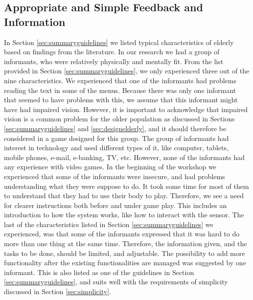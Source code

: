 \subsection{Appropriate and Simple Feedback and Information}
In Section \ref{sec:summaryguidelines} we listed typical characteristics of elderly based on findings from the literature. In our research we had a group of informants, who were relatively physically and mentally fit. From the list provided in Section \ref{sec:summaryguidelines}, we only experienced three out of the nine characteristics. We experienced that one of the informants had problems reading the text in some of the menus. Because there was only one informant that seemed to have problems with this, we assume that this informant might have had impaired vision. However, it is important to acknowledge that impaired vision is a common problem for the older population as discussed in Sections \ref{sec:summaryguidelines} and  \ref{sec:designelderly}, and it should therefore be considered in a game designed for this group. The group of informants had interest in technology and used different types of it, like computer, tablets, mobile phones, e-mail, e-banking, TV, etc. However, none of the informants had any experience with video games. In the beginning of the workshop we experienced that some of the informants were insecure, and had problems understanding what they were suppose to do. It took some time for most of them to understand that they had to use their body to play. Therefore, we see a need for clearer instructions both before and under game play. This includes an introduction to how the system works, like how to interact with the sensor. The last of the characteristics listed in Section \ref{sec:summaryguidelines}  we experienced, was that some of the informants expressed that it was hard to do more than one thing at the same time. Therefore, the information given, and the tasks to be done, should be limited, and adjustable. The possibility to add more functionality after the existing functionalities are managed was suggested by one informant. This is also listed as one of the guidelines in Section \ref{sec:summaryguidelines}, and suits well with the requirements of simplicity discussed in Section \ref{sec:simplicity}. 

